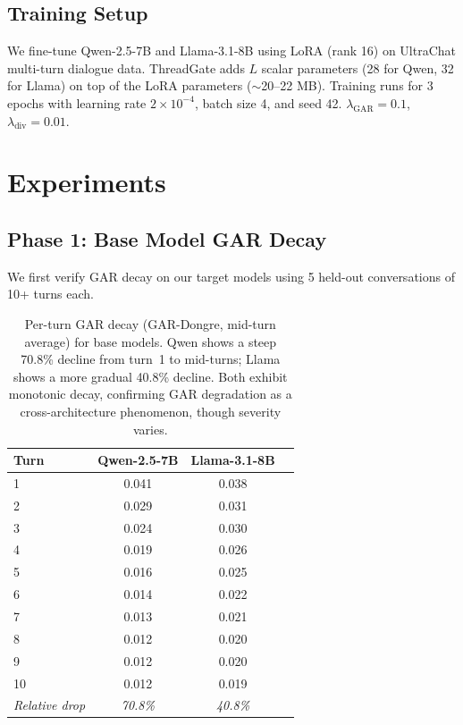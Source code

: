 \documentclass[11pt]{article}
\begin{document}
\subsection{Training Setup}

We fine-tune Qwen-2.5-7B and Llama-3.1-8B using LoRA (rank 16) on UltraChat multi-turn dialogue data.
ThreadGate adds $L$ scalar parameters (28 for Qwen, 32 for Llama) on top of the LoRA parameters ($\sim$20--22 MB).
Training runs for 3 epochs with learning rate $2\times10^{-4}$, batch size 4, and seed 42.
$\lambda_{\text{GAR}} = 0.1$, $\lambda_{\text{div}} = 0.01$.

\section{Experiments}
\label{sec:experiments}

\subsection{Phase 1: Base Model GAR Decay}

We first verify GAR decay on our target models using 5 held-out conversations of 10+ turns each.

\begin{table}[t]
\centering
\small
\begin{tabular}{lccc}
\toprule
\textbf{Turn} & \textbf{Qwen-2.5-7B} & \textbf{Llama-3.1-8B} \\
\midrule
1  & 0.041 & 0.038 \\
2  & 0.029 & 0.031 \\
3  & 0.024 & 0.030 \\
4  & 0.019 & 0.026 \\
5  & 0.016 & 0.025 \\
6  & 0.014 & 0.022 \\
7  & 0.013 & 0.021 \\
8  & 0.012 & 0.020 \\
9  & 0.012 & 0.020 \\
10 & 0.012 & 0.019 \\
\midrule
\textit{Relative drop} & \textit{70.8\%} & \textit{40.8\%} \\
\bottomrule
\end{tabular}
\caption{Per-turn GAR decay (GAR-Dongre, mid-turn average) for base models. Qwen shows a steep 70.8\% decline from turn~1 to mid-turns; Llama shows a more gradual 40.8\% decline. Both exhibit monotonic decay, confirming GAR degradation as a cross-architecture phenomenon, though severity varies.}
\label{tab:gar_decay}
\end{table}
\end{document}
